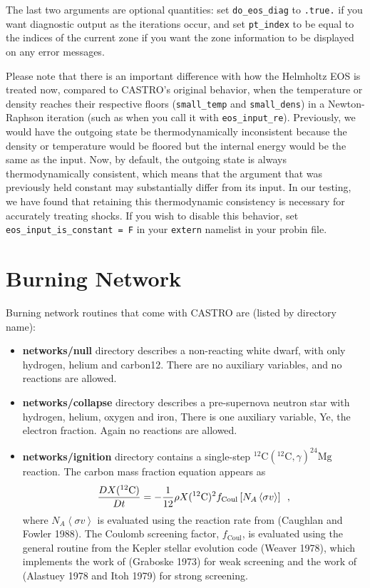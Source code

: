 The last two arguments are optional quantities: set \texttt{do\_eos\_diag} to \texttt{.true.} if you want diagnostic output as the iterations occur, and set \texttt{pt\_index} to be equal to the indices of the current zone if you want the zone information to be displayed on any error messages.

Please note that there is an important difference with how the Helmholtz EOS is treated now, compared to CASTRO's original behavior, when the temperature or density reaches their respective floors (\texttt{small\_temp} and \texttt{small\_dens}) in a Newton-Raphson iteration (such as when you call it with \texttt{eos\_input\_re}). Previously, we would have the outgoing state be thermodynamically inconsistent because the density or temperature would be floored but the internal energy would be the same as the input. Now, by default, the outgoing state is always thermodynamically consistent, which means that the argument that was previously held constant may substantially differ from its input. In our testing, we have found that retaining this thermodynamic consistency is necessary for accurately treating shocks. If you wish to disable this behavior, set \texttt{eos\_input\_is\_constant = F} in your \texttt{extern} namelist in your probin file.

\section{Burning Network}
Burning network routines that come with CASTRO are (listed by directory name):
\begin{itemize}
\item {\bf networks/null} directory describes a non-reacting white dwarf,
with only hydrogen, helium and carbon12.   There are
no auxiliary variables, and no reactions are allowed.
\item {\bf networks/collapse} directory describes a pre-supernova neutron
star with hydrogen, helium, oxygen and iron, There is one auxiliary
variable, Ye, the electron fraction.  Again no reactions are
allowed.
\item {\bf networks/ignition} directory contains a single-step
$^{12}\mathrm{C}(^{12}\mathrm{C},\gamma)^{24}\mathrm{Mg}$ reaction.
The carbon mass fraction equation appears as
\begin{equation}
\frac{D X(^{12}\mathrm{C})}{Dt} = - \frac{1}{12} \rho X(^{12}\mathrm{C})^2
    f_\mathrm{Coul} \left [N_A \left <\sigma v \right > \right]\enskip,
\end{equation}
where $N_A \left <\sigma v\right>$ is evaluated using the reaction
rate from (Caughlan and Fowler 1988).  The Coulomb screening factor,
$f_\mathrm{Coul}$, is evaluated using the general routine from the
Kepler stellar evolution code (Weaver 1978), which implements
the work of (Graboske 1973) for weak screening and the work of
(Alastuey 1978 and Itoh 1979) for strong screening.
\end{itemize}

